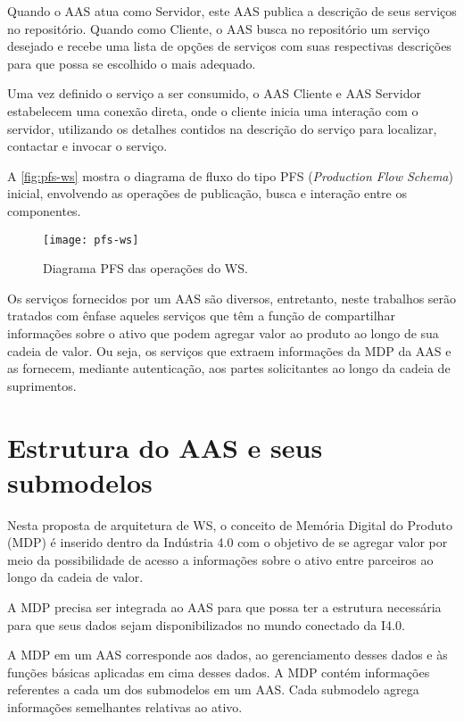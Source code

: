 	Quando o AAS atua como Servidor, este AAS publica a descrição de seus serviços no repositório. Quando como Cliente, o AAS busca no repositório um serviço desejado e recebe uma lista de opções de serviços com suas respectivas descrições para que possa se escolhido o mais adequado.
	
	Uma vez definido o serviço a ser consumido, o AAS Cliente e AAS Servidor estabelecem uma conexão direta, onde o cliente inicia uma interação com o servidor, utilizando os detalhes contidos na descrição do serviço para localizar, contactar e invocar o serviço.
	
	A \autoref{fig:pfs-ws} mostra o diagrama de fluxo do tipo PFS (\textit{Production Flow Schema}) inicial, envolvendo as operações de publicação, busca e interação entre os componentes.
	
	\begin{figure}[htb]
		\centering
		\caption{Diagrama PFS das operações do WS.}
		\label{fig:pfs-ws}
		\texttt{[image: pfs-ws]}
	\end{figure}

	Os serviços fornecidos por um AAS são diversos, entretanto, neste trabalhos serão tratados com ênfase aqueles serviços que têm a função de compartilhar informações sobre o ativo que podem agregar valor ao produto ao longo de sua cadeia de valor. Ou seja, os serviços que extraem informações da MDP da AAS e as fornecem, mediante autenticação, aos partes solicitantes ao longo da cadeia de suprimentos.

\section{Estrutura do AAS e seus submodelos}

	Nesta proposta de arquitetura de WS, o conceito de Memória Digital do Produto (MDP) é inserido dentro da Indústria 4.0 com o objetivo de se agregar valor por meio da possibilidade de acesso a informações sobre o ativo entre parceiros ao longo da cadeia de valor.
	
	A MDP precisa ser integrada ao AAS para que possa ter a estrutura necessária para que seus dados sejam disponibilizados no mundo conectado da I4.0.
	
	A MDP em um AAS corresponde aos dados, ao gerenciamento desses dados e às funções básicas aplicadas em cima desses dados. A MDP contém informações referentes a cada um dos submodelos em um AAS. Cada submodelo agrega informações semelhantes relativas ao ativo.
	
